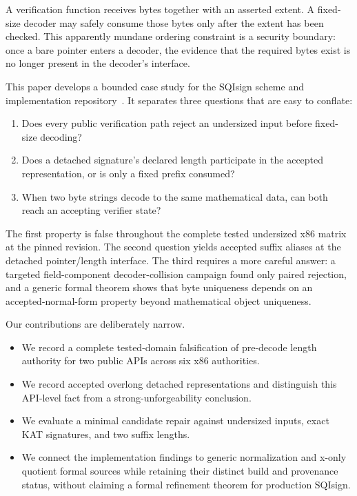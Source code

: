 \documentclass[11pt]{article}
\begin{document}
A verification function receives bytes together with an asserted extent.  A
fixed-size decoder may safely consume those bytes only after the extent has
been checked.  This apparently mundane ordering constraint is a security
boundary: once a bare pointer enters a decoder, the evidence that the required
bytes exist is no longer present in the decoder's interface.

This paper develops a bounded case study for the SQIsign scheme
\cite{sqisign-asiacrypt-2020} and implementation
repository~\cite{sqisign-implementation}.  It separates three questions that
are easy to conflate:

\begin{enumerate}
  \item Does every public verification path reject an undersized input before
        fixed-size decoding?
  \item Does a detached signature's declared length participate in the
        accepted representation, or is only a fixed prefix consumed?
  \item When two byte strings decode to the same mathematical data, can both
        reach an accepting verifier state?
\end{enumerate}

The first property is false throughout the complete tested undersized x86
matrix at the pinned revision.  The second question yields accepted suffix
aliases at the detached pointer/length interface.  The third requires a more
careful answer: a targeted field-component decoder-collision campaign found
only paired rejection, and a generic formal theorem shows that byte uniqueness
depends on an accepted-normal-form property beyond mathematical object
uniqueness.

Our contributions are deliberately narrow.

\begin{itemize}
  \item We record a complete tested-domain falsification of pre-decode length
        authority for two public APIs across six x86 authorities.
  \item We record accepted overlong detached representations and distinguish
        this API-level fact from a strong-unforgeability conclusion.
  \item We evaluate a minimal candidate repair against undersized inputs,
        exact KAT signatures, and two suffix lengths.
  \item We connect the implementation findings to generic normalization and
        x-only quotient formal sources while retaining their distinct build
        and provenance status, without claiming a formal refinement theorem
        for production SQIsign.
\end{itemize}
\end{document}

